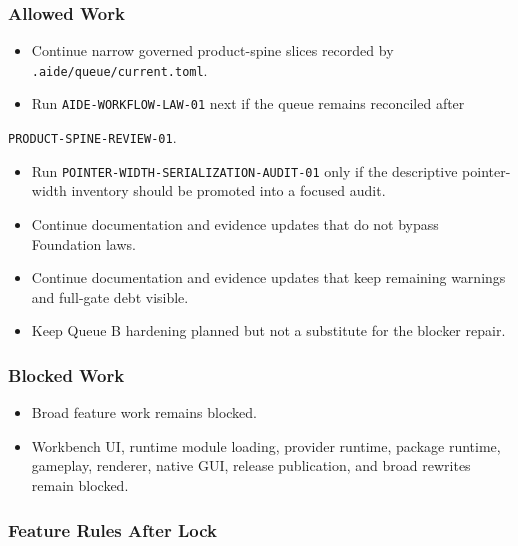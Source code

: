\documentclass[9pt,a4paper,openany]{book}
\begin{document}
\subsubsection{Allowed Work}

\begin{itemize}
\item Continue narrow governed product-\allowbreak{}spine slices recorded by \texttt{.\allowbreak{}aide/\allowbreak{}queue/\allowbreak{}current.\allowbreak{}toml}.\allowbreak{}
\item Run \texttt{AIDE-\allowbreak{}WORKFLOW-\allowbreak{}LAW-\allowbreak{}01} next if the queue remains reconciled after
\end{itemize}
\texttt{PRODUCT-\allowbreak{}SPINE-\allowbreak{}REVIEW-\allowbreak{}01}.\allowbreak{}

\begin{itemize}
\item Run \texttt{POINTER-\allowbreak{}WIDTH-\allowbreak{}SERIALIZATION-\allowbreak{}AUDIT-\allowbreak{}01} only if the descriptive pointer-\allowbreak{}width inventory should be promoted into a focused audit.\allowbreak{}
\item Continue documentation and evidence updates that do not bypass Foundation laws.\allowbreak{}
\item Continue documentation and evidence updates that keep remaining warnings and full-\allowbreak{}gate debt visible.\allowbreak{}
\item Keep Queue B hardening planned but not a substitute for the blocker repair.\allowbreak{}
\end{itemize}

\subsubsection{Blocked Work}

\begin{itemize}
\item Broad feature work remains blocked.\allowbreak{}
\item Workbench UI, runtime module loading, provider runtime, package runtime, gameplay, renderer, native GUI, release publication, and broad rewrites remain blocked.\allowbreak{}
\end{itemize}

\subsubsection{Feature Rules After Lock}
\end{document}
